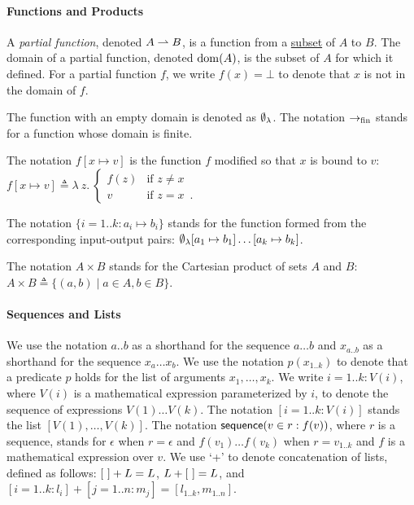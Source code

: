 \paragraph{Functions and Products \label{sec:FunctionsAndProducts}}

\begin{definition}
  A \emph{partial function}, denoted $A \rightharpoonup B$, is a function from a \underline{subset} of $A$ to $B$.
  The domain of a partial function, denoted $\operatorname{dom}(A)$, is the subset of $A$ for which it defined.
  For a partial function $f$, we write $f(x) = \bot$ to denote that $x$ is not in the domain of $f$.
\end{definition}

The function with an empty domain is denoted as ${\emptyset}_\lambda$.
The notation $\rightarrow_{\text{fin}}$ stands for a function whose domain is finite.

\begin{definition}
  The notation $f[x \mapsto v]$ is the function $f$ modified so that $x$ is bound
  to $v$: $f[x \mapsto v] \triangleq \lambda\ z.\ \begin{cases}
    f(z) & \text{if } z \neq x\\
    v & \text{if } z = x \enspace .
  \end{cases}$

  The notation $\{i=1..k: a_i\mapsto b_i\}$ stands for the function formed from the corresponding input-output pairs:
  ${\emptyset}_\lambda[a_1\mapsto b_1]\ldots[a_k\mapsto b_k]$.
\end{definition}

The notation $A \times B$ stands for the Cartesian product of sets $A$ and $B$: $A \times B \triangleq \{(a,b) \;|\; a \in A, b \in B\}$.

\paragraph{Sequences and Lists}
We use the notation $a..b$ as a shorthand for the sequence $a\ldots b$ and $x_{a..b}$ as a shorthand for the sequence $x_a \ldots x_b$.
%
We use the notation $p(x_{1..k})$ to denote that a predicate $p$ holds for the list of arguments $x_1,\ldots,x_k$.
%
We write $i=1..k: V(i)$, where $V(i)$ is a mathematical expression parameterized by $i$,
to denote the sequence of expressions $V(1) \ldots V(k)$.
The notation $[i=1..k: V(i)]$ stands the list $[V(1),\ldots,V(k)]$.
The notation $\textsf{sequence}(v\in r: f(v))$, where $r$ is a sequence, stands for $\epsilon$ when $r=\epsilon$ and
$f(v_1) \ldots f(v_k)$ when $r=v_{1..k}$ and $f$ is a mathematical expression over $v$.
%
We use `+' to denote concatenation of lists, defined as follows: $[\ ] + L = L$, $L + [\ ] = L$, and $[i=1..k: l_i] + [j=1..n: m_j] = [l_{1..k}, m_{1..n}]$.

